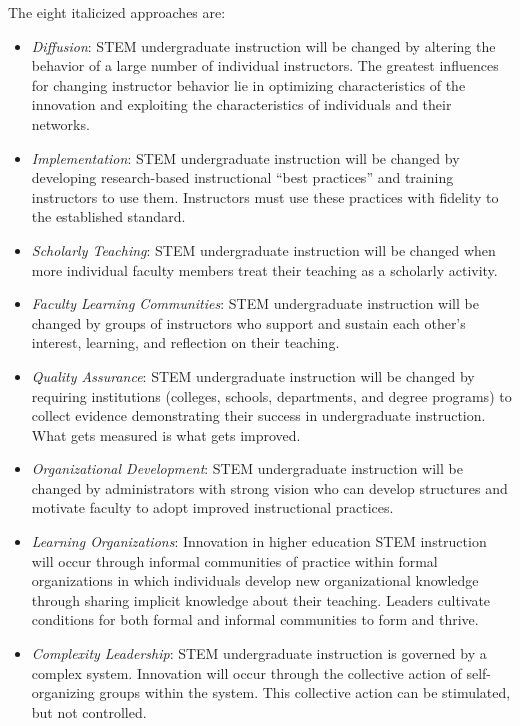 The eight italicized approaches are:

\begin{itemize}

\item
  \emph{Diffusion}: STEM undergraduate instruction will be changed by
  altering the behavior of a large number of individual
  instructors. The greatest influences for changing instructor
  behavior lie in optimizing characteristics of the innovation and
  exploiting the characteristics of individuals and their networks.

\item
  \emph{Implementation}: STEM undergraduate instruction will be
  changed by developing research-based instructional ``best
  practices'' and training instructors to use them. Instructors must
  use these practices with fidelity to the established standard.

\item
  \emph{Scholarly Teaching}: STEM undergraduate instruction will be
  changed when more individual faculty members treat their teaching as
  a scholarly activity.

\item
  \emph{Faculty Learning Communities}: STEM undergraduate instruction
  will be changed by groups of instructors who support and sustain
  each other's interest, learning, and reflection on their teaching.

\item
  \emph{Quality Assurance}: STEM undergraduate instruction will be
  changed by requiring institutions (colleges, schools, departments,
  and degree programs) to collect evidence demonstrating their success
  in undergraduate instruction. What gets measured is what gets
  improved.

\item
  \emph{Organizational Development}: STEM undergraduate instruction
  will be changed by administrators with strong vision who can develop
  structures and motivate faculty to adopt improved instructional
  practices.

\item
  \emph{Learning Organizations}: Innovation in higher education STEM
  instruction will occur through informal communities of practice
  within formal organizations in which individuals develop new
  organizational knowledge through sharing implicit knowledge about
  their teaching.  Leaders cultivate conditions for both formal and
  informal communities to form and thrive.

\item
  \emph{Complexity Leadership}: STEM undergraduate instruction is
  governed by a complex system. Innovation will occur through the
  collective action of self-organizing groups within the system. This
  collective action can be stimulated, but not controlled.

\end{itemize}

